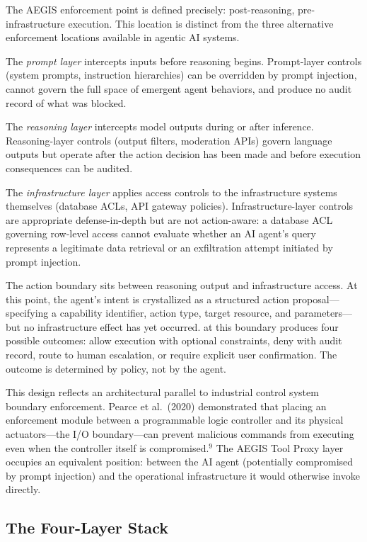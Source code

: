 \documentclass{IEEEcsmag}
\begin{document}
The AEGIS enforcement point is defined precisely: post-reasoning, pre-infrastructure execution. This location is distinct from the three alternative enforcement locations available in agentic AI systems.

The {\it prompt layer} intercepts inputs before reasoning begins. Prompt-layer controls (system prompts, instruction hierarchies) can be overridden by prompt injection, cannot govern the full space of emergent agent behaviors, and produce no audit record of what was blocked.

The {\it reasoning layer} intercepts model outputs during or after inference. Reasoning-layer controls (output filters, moderation APIs) govern language outputs but operate after the action decision has been made and before execution consequences can be audited.

The {\it infrastructure layer} applies access controls to the infrastructure systems themselves (database ACLs, API gateway policies). Infrastructure-layer controls are appropriate defense-in-depth but are not action-aware: a database ACL governing row-level access cannot evaluate whether an AI agent's query represents a legitimate data retrieval or an exfiltration attempt initiated by prompt injection.

The action boundary sits between reasoning output and infrastructure access. At this point, the agent's intent is crystallized as a structured action proposal---specifying a capability identifier, action type, target resource, and parameters---but no infrastructure effect has yet occurred.  at this boundary produces four possible outcomes: allow execution with optional constraints, deny with audit record, route to human escalation, or require explicit user confirmation. The outcome is determined by policy, not by the agent.

This design reflects an architectural parallel to industrial control system boundary enforcement. Pearce et al.\ (2020) demonstrated that placing an enforcement module between a programmable logic controller and its physical actuators---the I/O boundary---can prevent malicious commands from executing even when the controller itself is compromised.$^{9}$ The AEGIS Tool Proxy layer occupies an equivalent position: between the AI agent (potentially compromised by prompt injection) and the operational infrastructure it would otherwise invoke directly.

\subsection{The Four-Layer Stack}
\end{document}
